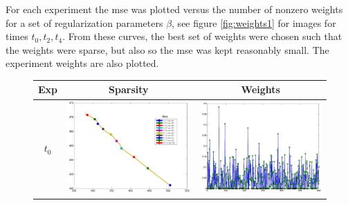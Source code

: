 \documentclass[11pt]{article}
\begin{document}
For each experiment the {\sf mse} was plotted versus the number of nonzero weights for a set of regularization parameters $\beta$, see figure \ref{fig:weights1} for images for times $t_0,t_2,t_4$. From these curves, the best set of weights were chosen such that the weights were sparse, but also so the {\sf mse} was kept reasonably small. The experiment weights are also plotted.  
\begin{figure}[!h]
	\renewcommand{\arraystretch}{1.5}
	\begin{center}
		\iwidth=80mm
		\begin{tabular}{|c|c|c|} %
			\hline		
			Exp & Sparsity & Weights	\\
			\hline	
			$t_0$
			&	
			\includegraphics[width=.8\iwidth]{figures/newFigs/exp1paretoWeights}
			&
			\includegraphics[width=.8\iwidth]{figures/newFigs/exp1Weights}\\

\end{tabular}
\end{center}
\end{figure}
\end{document}
